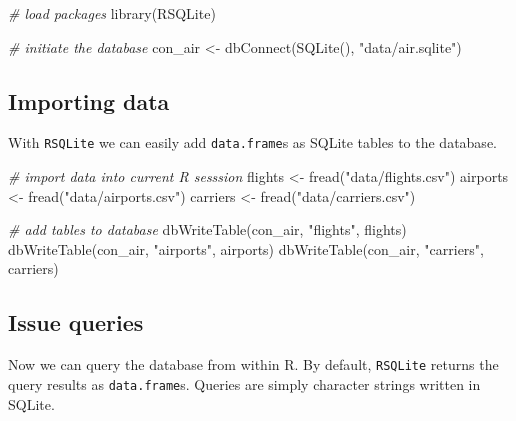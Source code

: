 \documentclass[
  12pt,
]{style/krantz}
\newenvironment{Shaded}{\begin{snugshade}}{\end{snugshade}}
\newcommand{\CommentTok}[1]{\textcolor[rgb]{0.56,0.35,0.01}{\textit{#1}}}
\newcommand{\FunctionTok}[1]{\textcolor[rgb]{0.00,0.00,0.00}{#1}}
\newcommand{\NormalTok}[1]{#1}
\newcommand{\OtherTok}[1]{\textcolor[rgb]{0.56,0.35,0.01}{#1}}
\newcommand{\StringTok}[1]{\textcolor[rgb]{0.31,0.60,0.02}{#1}}
\begin{document}
\begin{Shaded}
\begin{Highlighting}[]
\CommentTok{\# load packages}
\FunctionTok{library}\NormalTok{(RSQLite)}

\CommentTok{\# initiate the database}
\NormalTok{con\_air }\OtherTok{\textless{}{-}} \FunctionTok{dbConnect}\NormalTok{(}\FunctionTok{SQLite}\NormalTok{(), }\StringTok{"data/air.sqlite"}\NormalTok{)}
\end{Highlighting}
\end{Shaded}

\hypertarget{importing-data}{%
\subsection{Importing data}\label{importing-data}}

With \texttt{RSQLite} we can easily add \texttt{data.frame}s as SQLite tables to the database.

\begin{Shaded}
\begin{Highlighting}[]
\CommentTok{\# import data into current R sesssion}
\NormalTok{flights }\OtherTok{\textless{}{-}} \FunctionTok{fread}\NormalTok{(}\StringTok{"data/flights.csv"}\NormalTok{)}
\NormalTok{airports }\OtherTok{\textless{}{-}} \FunctionTok{fread}\NormalTok{(}\StringTok{"data/airports.csv"}\NormalTok{)}
\NormalTok{carriers }\OtherTok{\textless{}{-}} \FunctionTok{fread}\NormalTok{(}\StringTok{"data/carriers.csv"}\NormalTok{)}

\CommentTok{\# add tables to database}
\FunctionTok{dbWriteTable}\NormalTok{(con\_air, }\StringTok{"flights"}\NormalTok{, flights)}
\FunctionTok{dbWriteTable}\NormalTok{(con\_air, }\StringTok{"airports"}\NormalTok{, airports)}
\FunctionTok{dbWriteTable}\NormalTok{(con\_air, }\StringTok{"carriers"}\NormalTok{, carriers)}
\end{Highlighting}
\end{Shaded}

\hypertarget{issue-queries}{%
\subsection{Issue queries}\label{issue-queries}}

Now we can query the database from within R. By default, \texttt{RSQLite} returns the query results as \texttt{data.frame}s. Queries are simply character strings written in SQLite.
\end{document}
